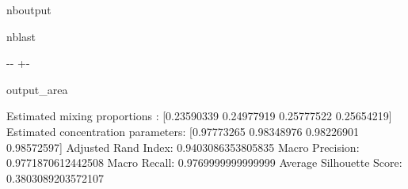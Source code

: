 \documentclass[letterpaper,10pt,english,openany,oneside]{sphinxmanual}
\begin{document}
\begin{sphinxuseclass}{nboutput}
\begin{sphinxuseclass}{nblast}
{

\kern-\sphinxverbatimsmallskipamount\kern-\baselineskip
\kern+\FrameHeightAdjust\kern-\fboxrule
\vspace{\nbsphinxcodecellspacing}

\begin{sphinxuseclass}{output_area}
\begin{sphinxuseclass}{}


\begin{sphinxVerbatim}[commandchars=\\\{\}]
Estimated mixing proportions : [0.23590339 0.24977919 0.25777522 0.25654219]
Estimated concentration parameters:  [0.97773265 0.98348976 0.98226901 0.98572597]
Adjusted Rand Index: 0.9403086353805835
Macro Precision: 0.9771870612442508
Macro Recall: 0.9769999999999999
Average Silhouette Score: 0.3803089203572107
\end{sphinxVerbatim}



\end{sphinxuseclass}
\end{sphinxuseclass}
}

\end{sphinxuseclass}
\end{sphinxuseclass}
\end{document}
